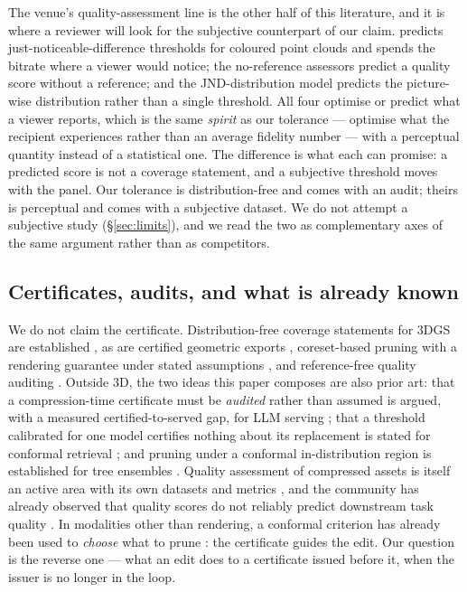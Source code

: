 \documentclass[preprint,number,3p]{elsarticle}
\begin{document}
The venue's quality-assessment line is the other half of this literature, and it is where a reviewer will look for the
subjective counterpart of our claim. \cite{jvcir-mjnd} predicts just-noticeable-difference thresholds for coloured
point clouds and spends the bitrate where a viewer would notice; the no-reference assessors \cite{jvcir-multiviewiqa,
jvcir-msfiqa} predict a quality score without a reference; and the JND-distribution model \cite{jvcir-surnet} predicts
the picture-wise distribution rather than a single threshold. All four optimise or predict what a viewer reports,
which is the same \emph{spirit} as our tolerance --- optimise what the recipient experiences rather than an average
fidelity number --- with a perceptual quantity instead of a statistical one. The difference is what each can promise:
a predicted score is not a coverage statement, and a subjective threshold moves with the panel. Our tolerance is
distribution-free and comes with an audit; theirs is perceptual and comes with a subjective dataset. We do not attempt
a subjective study (\S\ref{sec:limits}), and we read the two as complementary axes of the same argument rather than as
competitors.

\subsection{Certificates, audits, and what is already known}
\label{sec:rw-audit}

We do not claim the certificate. Distribution-free coverage statements for 3DGS are established \cite{quantilegs,
vscp,aura}, as are certified geometric exports \cite{manifoldgs}, coreset-based pruning with a rendering guarantee
under stated assumptions \cite{provablepruning}, and reference-free quality auditing \cite{splataudit}. Outside 3D,
the two ideas this paper composes are also prior art: that a compression-time certificate must be \emph{audited}
rather than assumed is argued, with a measured certified-to-served gap, for LLM serving \cite{runtimeprice}; that a
threshold calibrated for one model certifies nothing about its replacement is stated for conformal retrieval
\cite{refresh}; and pruning under a conformal in-distribution region is established for tree ensembles
\cite{pine}. Quality assessment of compressed assets is itself an active area with its own datasets and metrics
\cite{gscompqa,gsbench,gsppm}, and the community has already observed that quality scores do not reliably predict
downstream task quality \cite{yubi}. In modalities other than rendering, a conformal criterion has already been used to \emph{choose} what to prune \cite{candidatesaliency}: the certificate guides the edit. Our question is the reverse one --- what an edit does to a certificate issued before it, when the issuer is no longer in the loop.
\end{document}
